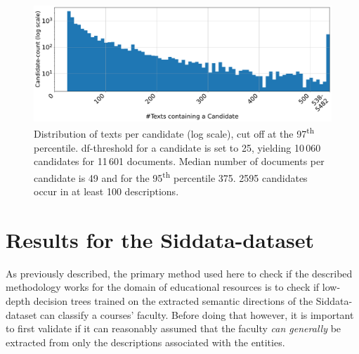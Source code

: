 \begin{figure}[H]
	\centering
	\includegraphics[width=\figwidth]{graphics/dataset_new/docs_per_phrase.pdf}
	\caption[Distribution of texts per candidate]{Distribution of texts per candidate (log scale), cut off at the 97\textsuperscript{th} percentile. \Gls{df}-threshold for a candidate is set to 25, yielding 10\,060 candidates for 11\,601 documents. Median number of documents per candidate is 49 and for the 95\textsuperscript{th} percentile 375. 2595 candidates occur in at least 100 descriptions.}
	\label{fig:candidate_histogram}
\end{figure}


\section{Results for the Siddata-dataset}
\label{sec:results_siddata}

As previously described, the primary method used here to check if the described methodology works for the domain of educational resources is to check if low-depth decision trees trained on the extracted semantic directions of the Siddata-dataset can classify a courses' faculty. Before doing that however, it is important to first validate if it can reasonably assumed that the faculty \textit{can generally} be extracted from only the descriptions associated with the entities.






